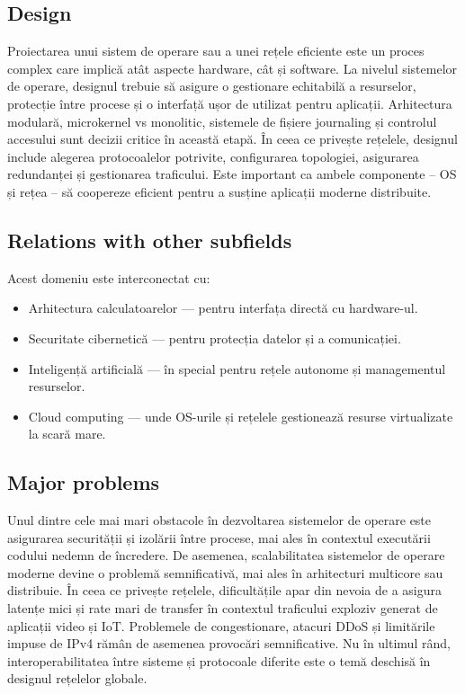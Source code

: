 \documentclass[12pt, letterpaper]{article}
\begin{document}
\subsection*{Design}
Proiectarea unui sistem de operare sau a unei rețele eficiente este un proces complex care implică atât aspecte hardware, cât și software. La nivelul sistemelor de operare, designul trebuie să asigure o gestionare echitabilă a resurselor, protecție între procese și o interfață ușor de utilizat pentru aplicații. Arhitectura modulară, microkernel vs monolitic, sistemele de fișiere journaling și controlul accesului sunt decizii critice în această etapă. În ceea ce privește rețelele, designul include alegerea protocoalelor potrivite, configurarea topologiei, asigurarea redundanței și gestionarea traficului. Este important ca ambele componente – OS și rețea – să coopereze eficient pentru a susține aplicații moderne distribuite.

\subsection*{Relations with other subfields}
Acest domeniu este interconectat cu:
\begin{itemize}
    \item Arhitectura calculatoarelor — pentru interfața directă cu hardware-ul.
    \item Securitate cibernetică — pentru protecția datelor și a comunicației.
    \item Inteligență artificială — în special pentru rețele autonome și managementul resurselor.
    \item Cloud computing — unde OS-urile și rețelele gestionează resurse virtualizate la scară mare.
\end{itemize}

\subsection*{Major problems}
Unul dintre cele mai mari obstacole în dezvoltarea sistemelor de operare este asigurarea securității și izolării între procese, mai ales în contextul executării codului nedemn de încredere. De asemenea, scalabilitatea sistemelor de operare moderne devine o problemă semnificativă, mai ales în arhitecturi multicore sau distribuie. În ceea ce privește rețelele, dificultățile apar din nevoia de a asigura latențe mici și rate mari de transfer în contextul traficului exploziv generat de aplicații video și IoT. Problemele de congestionare, atacuri DDoS și limitările impuse de IPv4 rămân de asemenea provocări semnificative. Nu în ultimul rând, interoperabilitatea între sisteme și protocoale diferite este o temă deschisă în designul rețelelor globale.
\end{document}
